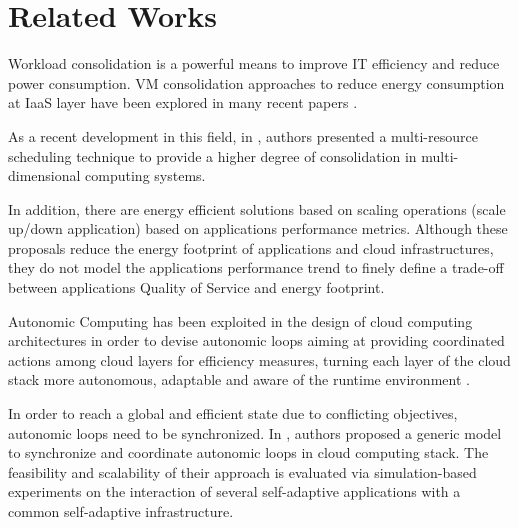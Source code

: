 \section{Related Works}
\label{sec: relworks}

Workload consolidation is a powerful means to improve IT efficiency and reduce power consumption.
VM consolidation approaches to reduce energy consumption at IaaS layer have been explored in many recent papers \cite{Cardosa} \cite{ITProf1} \cite{Schroder} \cite{Hermenier2009} \cite{sheikhalishahi_energy_2011} \cite{sheikhalishahi_multi-capacity_2014} \cite{dupont2015plug4green}.

As a recent development in this field, in \cite{sheikhalishahi_multi-capacity_2014}, authors presented a multi-resource scheduling technique to provide a higher degree of consolidation in multi-dimensional computing systems.

In addition, there are energy efficient solutions based on scaling operations (scale up/down application) based on applications performance metrics.
Although these proposals reduce the energy footprint of applications and cloud infrastructures, they do not model the applications performance trend to finely define a trade-off between applications Quality of Service and energy footprint.

Autonomic Computing has been exploited in the design of cloud computing architectures in order to devise autonomic loops aiming at providing coordinated actions among cloud layers for efficiency measures, turning each layer of the cloud stack more autonomous, adaptable and aware of the runtime environment \cite{alvares_de_oliveira_synchronization_2012} \cite{de_oliveira_self-management_2012}  \cite{de_oliveira_framework_2013}.

In order to reach a global and efficient state due to conflicting objectives, autonomic loops need to be synchronized.
In \cite{alvares_de_oliveira_synchronization_2012}, authors proposed a generic model to synchronize and coordinate autonomic loops in cloud computing stack. 
The feasibility and scalability of their approach is evaluated via simulation-based experiments on the interaction of several self-adaptive applications with a common self-adaptive infrastructure.


